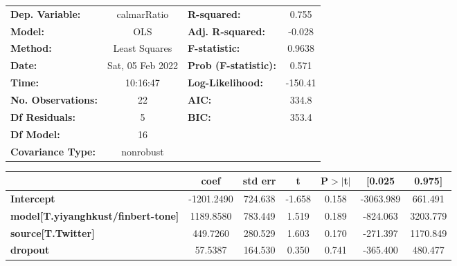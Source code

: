 \begin{center}
\begin{tabular}{lclc}
\toprule
\textbf{Dep. Variable:}                    &   calmarRatio    & \textbf{  R-squared:         } &     0.755   \\
\textbf{Model:}                            &       OLS        & \textbf{  Adj. R-squared:    } &    -0.028   \\
\textbf{Method:}                           &  Least Squares   & \textbf{  F-statistic:       } &    0.9638   \\
\textbf{Date:}                             & Sat, 05 Feb 2022 & \textbf{  Prob (F-statistic):} &    0.571    \\
\textbf{Time:}                             &     10:16:47     & \textbf{  Log-Likelihood:    } &   -150.41   \\
\textbf{No. Observations:}                 &          22      & \textbf{  AIC:               } &     334.8   \\
\textbf{Df Residuals:}                     &           5      & \textbf{  BIC:               } &     353.4   \\
\textbf{Df Model:}                         &          16      & \textbf{                     } &             \\
\textbf{Covariance Type:}                  &    nonrobust     & \textbf{                     } &             \\
\bottomrule
\end{tabular}
\begin{tabular}{lcccccc}
                                           & \textbf{coef} & \textbf{std err} & \textbf{t} & \textbf{P$> |$t$|$} & \textbf{[0.025} & \textbf{0.975]}  \\
\midrule
\textbf{Intercept}                         &   -1201.2490  &      724.638     &    -1.658  &         0.158        &    -3063.989    &      661.491     \\
\textbf{model[T.yiyanghkust/finbert-tone]} &    1189.8580  &      783.449     &     1.519  &         0.189        &     -824.063    &     3203.779     \\
\textbf{source[T.Twitter]}                 &     449.7260  &      280.529     &     1.603  &         0.170        &     -271.397    &     1170.849     \\
\textbf{dropout}                           &      57.5387  &      164.530     &     0.350  &         0.741        &     -365.400    &      480.477     \\

\end{tabular}
\end{center}
